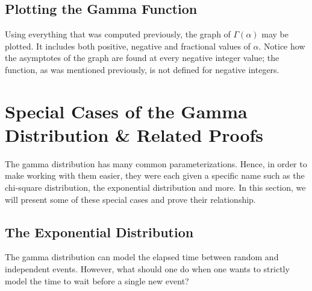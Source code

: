 \documentclass[12pt]{article}
\begin{document}

\pagebreak
\subsection{Plotting the Gamma Function}
Using everything that was computed previously, the graph of $\Gamma(\alpha)$ may be plotted. It includes both positive,
negative and fractional values of $\alpha$. Notice how the asymptotes of the graph are found at every negative integer
value; the function, as was mentioned previously, is not defined for negative integers.


\pagebreak
\section{Special Cases of the Gamma Distribution \& Related Proofs}
The gamma distribution has many common parameterizations. Hence, in order to make working with them easier, they were
each given a specific name such as the chi-square distribution, the exponential distribution and more. In this section,
we will present some of these special cases and prove their relationship.

\subsection{The Exponential Distribution}\label{subsec:specialcases:exponential}
The gamma distribution can model the elapsed time between random and independent events. However, what should one do
when one wants to strictly model the time to wait before a single new event?
\end{document}
